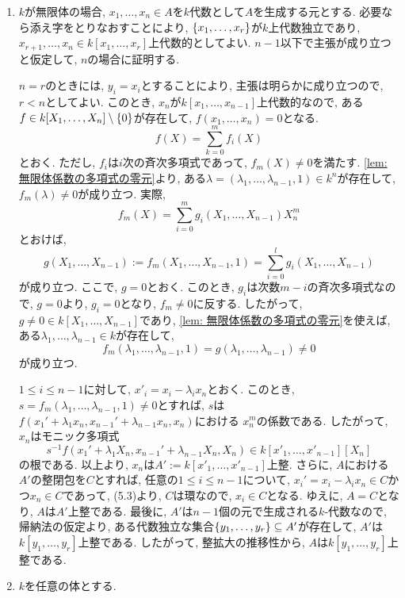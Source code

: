 \documentclass[dvipdfmx]{jsarticle}
\begin{document}
    \begin{problem}
        \begin{enumerate}
            \item $k$が無限体の場合,
            $x_1, \dots, x_n \in A$を$k$代数として$A$を生成する元とする.
            必要なら添え字をとりなおすことにより,
            $\{x_1, \dots, x_r\}$が$k$上代数独立であり, $x_{r+1}, \dots, x_n \in k[x_1, \dots, x_r]$上代数的としてよい.
            $n-1$以下で主張が成り立つと仮定して, $n$の場合に証明する.

            $n = r$のときには, $y_i = x_i$とすることにより, 主張は明らかに成り立つので,
            $r < n$としてよい.
            このとき, $x_n$が$k[x_1, \dots, x_{n-1}]$上代数的なので,
            ある$f \in k[X_1, \dots, X_n] \setminus \{0\}$が存在して,
            $f(x_1, \dots, x_n) = 0$となる.
            \[
                f(X) = \sum_{k = 0}^m f_i(X)
            \]
            とおく.
            ただし, $f_i$は$i$次の斉次多項式であって,
            $f_m(X) \neq 0$を満たす.
            \cref{lem: 無限体係数の多項式の零元}より, ある$\lambda = (\lambda_1, \dots, \lambda_{n-1}, 1) \in k^n$が存在して,
            $f_m(\lambda) \neq 0$が成り立つ.
            実際,
            \[
                f_m(X) = \sum_{i = 0}^m g_{i}(X_1, \dots, X_{n-1})X_n^m
            \]
            とおけば,
            \[
                g(X_1, \dots, X_{n-1}) := f_m(X_1, \dots, X_{n-1}, 1) = \sum_{i = 0}^l g_i(X_1, \dots, X_{n-1})
            \]
            が成り立つ.
            ここで, $g = 0$とおく.
            このとき, $g_i$は次数$m-i$の斉次多項式なので, $g = 0$より, $g_i = 0$となり,
            $f_m \neq 0$に反する.
            したがって, $g \neq 0 \in k[X_1, \dots, X_{n-1}]$であり,
            \cref{lem: 無限体係数の多項式の零元}を使えば, ある$\lambda_1, \dots, \lambda_{n-1} \in k$が存在して,
            \[
                f_m(\lambda_1, \dots, \lambda_{n-1}, 1) = g(\lambda_1, \dots, \lambda_{n-1}) \neq 0
            \]
            が成り立つ.

            $1 \leq i \leq n-1$に対して, $x'_i = x_i - \lambda_i x_n$とおく.
            このとき, $s = f_m(\lambda_1, \dots, \lambda_{n-1}, 1) \neq 0$とすれば,
            $s$は$f(x_1' + \lambda_1x_n, x_{n-1}' + \lambda_{n-1}x_n, x_n)$における
            $x_n^m$の係数である.
            したがって,
            $x_n$はモニック多項式
            \[
                s^{-1}f(x_1' + \lambda_1X_n,x_{n-1}' + \lambda_{n-1}X_n, X_n) \in k[x'_1, \dots, x'_{n-1}][X_n]
            \]
            の根である.
            以上より, $x_n$は$A' := k[x'_1, \dots, x'_{n-1}]$上整.
            さらに, $A$における$A'$の整閉包を$C$とすれば,
            任意の$1 \leq i \leq n-1$について,
            $x_i' = x_i - \lambda_ix_n \in C$かつ$x_n \in C$であって, (5.3)より, $C$は環なので,
            $x_i \in C$となる.
            ゆえに, $A = C$となり, $A$は$A'$上整である.
            最後に, $A'$は$n-1$個の元で生成される$k$-代数なので, 帰納法の仮定より,
            ある代数独立な集合$\{y_1, \dots, y_r\} \subseteq A'$が存在して,
            $A'$は$k[y_1, \dots, y_r]$上整である.
            したがって, 整拡大の推移性から, $A$は$k[y_1, \dots, y_r]$上整である.
            \item $k$を任意の体とする.


\end{enumerate}
\end{problem}
\end{document}
